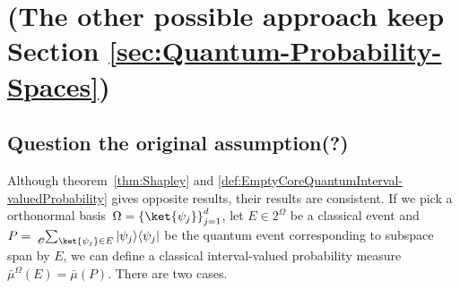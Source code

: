 \documentclass{article}
\theoremstyle{remark}
\newcommand{\op}[2]{\ensuremath{\left\vert{#1}\middle\rangle\middle\langle{#2}\right\vert}}
\newcommand{\proj}[1]{\op{#1}{#1}}
\begin{document}
\section{(The other possible approach keep Section \ref{sec:Quantum-Probability-Spaces}) }



\subsection{Question the original assumption(?)}

Although theorem~\ref{thm:Shapley} and \ref{def:EmptyCoreQuantumInterval-valuedProbability}
gives opposite results, their results are consistent. If we pick a
orthonormal basis~$\Omega=\left\{ \ket{\psi_{j}}\right\} _{j=1}^{d}$,
let $E\in2^{\Omega}$ be a classical event and $P=\tensor*[_{\mathscr{O}}]{\sum}{_{\ket{\psi_{j}}\in E}}\proj{\psi_{j}}$
be the quantum event corresponding to subspace span by $E$, we can
define a classical interval-valued probability measure$\bar{\mu}^{\Omega}\left(E\right)=\bar{\mu}\left(P\right)$.
There are two cases.
\end{document}
